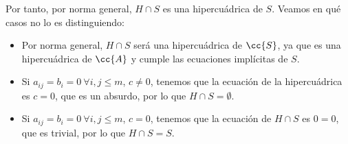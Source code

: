 \begin{ejercicio}
\begin{enumerate}
        Por tanto, por norma general, $H\cap S$ es una hipercuádrica de $S$. Veamos en qué casos no lo es distinguiendo:
        \begin{itemize}
            \item Por norma general, $H\cap S$ será una hipercuádrica de $\cc{S}$, ya que es una hipercuádrica de $\cc{A}$ y cumple las ecuaciones implícitas de $S$.
            \item Si $a_{ij}=b_i=0~\forall i,j\leq m$, $c\neq 0$, tenemos que la ecuación de la hipercuádrica es $c=0$, que es un absurdo, por lo que $H\cap S=\emptyset$.
            \item Si $a_{ij}=b_i=0~\forall i,j\leq m$, $c=0$, tenemos que la ecuación de $H\cap S$ es $0=0$, que es trivial, por lo que $H\cap S=S$.
        \end{itemize}
    \end{enumerate}
\end{ejercicio}



